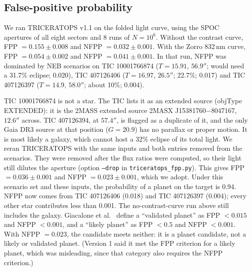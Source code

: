 \documentclass[11pt]{article}
\begin{document}
\subsection{False-positive probability}
We ran \textsc{TRICERATOPS} v1.1 \cite{triceratops} on the folded light curve, using the SPOC apertures of all eight sectors and 8 runs of $N=10^6$. Without the contrast curve, FPP $=0.155\pm0.008$ and NFPP $=0.032\pm0.001$. With the Zorro 832\,nm curve, FPP $=0.054\pm0.002$ and NFPP $=0.041\pm0.001$. In that run, NFPP was dominated by NEB scenarios on TIC 10001766874 ($T=15.91$, $56.9''$; would need a 31.7\% eclipse; 0.020), TIC 407126406 ($T=16.97$, $26.5''$; 22.7\%; 0.017) and TIC 407126397 ($T=14.9$, $58.0''$; about 10\%; 0.004).

TIC 10001766874 is not a star. The TIC lists it as an extended source (objType EXTENDED): it is the 2MASS extended source 2MASX J15381760$-$8047167, $12.6''$ across. TIC 407126394, at $57.4''$, is flagged as a duplicate of it, and the only Gaia DR3 source at that position ($G=20.9$) has no parallax or proper motion. It is most likely a galaxy, which cannot host a 32\% eclipse of its total light. We reran \textsc{TRICERATOPS} with the same inputs and both entries removed from the scenarios. They were removed after the flux ratios were computed, so their light still dilutes the aperture (option \texttt{--drop} in \texttt{triceratops\_fpp.py}). This gives FPP $=0.036\pm0.001$ and NFPP $=0.023\pm0.001$, which we adopt. Under this scenario set and these inputs, the probability of a planet on the target is 0.94. NFPP now comes from TIC 407126406 (0.018) and TIC 407126397 (0.004); every other star contributes less than 0.001. The no-contrast-curve run above still includes the galaxy. Giacalone et al.\ \cite{triceratops} define a ``validated planet'' as FPP $<0.015$ and NFPP $<0.001$, and a ``likely planet'' as FPP $<0.5$ and NFPP $<0.001$. With NFPP $=0.023$, the candidate meets neither: it is a planet candidate, not a likely or validated planet. (Version 1 said it met the FPP criterion for a likely planet, which was misleading, since that category also requires the NFPP criterion.)
\end{document}
